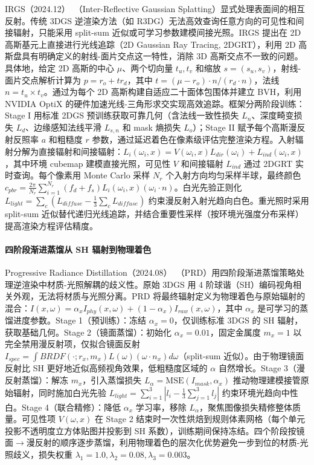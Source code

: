IRGS（2024.12）~\cite{2412_15867}（Inter-Reflective Gaussian Splatting）显式处理表面间的相互反射。传统 3DGS 逆渲染方法（如 R3DG）无法高效查询任意方向的可见性和间接辐射，只能采用 split-sum 近似或可学习参数建模间接光照。IRGS 提出在 2D 高斯基元上直接进行光线追踪（2D Gaussian Ray Tracing, 2DGRT），利用 2D 高斯盘具有明确定义的射线-面片交点这一特性，消除 3D 高斯交点不一致的问题。具体地，给定 2D 高斯的中心 $\mu$、两个切向量 $t_u, t_v$ 和缩放 $s=(s_u,s_v)$，射线-面片交点解析计算为 $p = r_o + t r_d$，其中 $t = (\mu - r_o) \cdot n / (r_d \cdot n)$，法线 $n = t_u \times t_v$。通过为每个 2D 高斯构建自适应二十面体包围体并建立 BVH，利用 NVIDIA OptiX 的硬件加速光线-三角形求交实现高效追踪。框架分两阶段训练：Stage I 用标准 2DGS 预训练获取可靠几何（含法线一致性损失 $L_n$、深度畸变损失 $L_d$、边缘感知法线平滑 $L_{s,n}$ 和 mask 熵损失 $L_o$）；Stage II 赋予每个高斯漫反射反照率 $a$ 和粗糙度 $r$ 参数，通过延迟着色在像素级评估完整渲染方程。入射辐射分解为直接辐射和间接辐射：$L_i(\omega_i, x) = V(\omega_i, x) L_{dir}(\omega_i) + L_{ind}(\omega_i, x)$，其中环境 cubemap 建模直接光照，可见性 $V$ 和间接辐射 $L_{ind}$ 通过 2DGRT 实时查询。每个像素用 Monte Carlo 采样 $N_r$ 个入射方向均匀采样半球，最终颜色 $c_{pbr} = \frac{2\pi}{N_r}\sum_{i=1}^{N_r}(f_d+f_s) L_i(\omega_i, x)(\omega_i \cdot n)$。白光先验正则化 $L_{light} = \sum_c (L_{diffuse} - \frac{1}{3}\sum_c L_{diffuse})$ 约束漫反射入射光趋向白色。重光照时采用 split-sum 近似替代递归光线追踪，并结合重要性采样（按环境光强度分布采样）提高渲染方程评估精度。

\paragraph{四阶段渐进蒸馏从 SH 辐射到物理着色}

Progressive Radiance Distillation（2024.08）~\cite{2408_07595}（PRD）用四阶段渐进蒸馏策略处理逆渲染中材质-光照解耦的歧义性。原始 3DGS 用 4 阶球谐（SH）编码视角相关外观，无法将材质与光照分离。PRD 将最终辐射定义为物理着色与原始辐射的混合：$I(x,\omega) = \alpha_x I_{phy}(x,\omega) + (1-\alpha_x) I_{raw}(x,\omega)$，其中 $\alpha_x$ 是可学习的蒸馏进度参数。Stage 1（预训练）：冻结 $\alpha_x=0$，仅训练标准 3DGS 的 SH 辐射，获取基础几何。Stage 2（镜面蒸馏）：初始化 $\alpha_x=0.01$，固定金属度 $m_x=1$ 以完全禁用漫反射项，仅拟合镜面反射 $I_{spec} = \int BRDF(\cdot; r_x, m_x) L(\omega) (\omega \cdot n_x) d\omega$（split-sum 近似）。由于物理镜面反射比 SH 更好地近似高频视角效果，低粗糙度区域的 $\alpha$ 自然增长。Stage 3（漫反射蒸馏）：解冻 $m_x$，引入蒸馏损失 $L_\alpha = \text{MSE}(I_{mask}, \alpha_x)$ 推动物理建模接管原始辐射，同时施加白光先验 $L_{light} = \sum_{i=1}^{3}|l_i - \frac{1}{3}\sum_{j=1}^{3} l_j|$ 约束环境光趋向中性白。Stage 4（联合精修）：降低 $\alpha_x$ 学习率，移除 $L_\alpha$，聚焦图像损失精修整体质量。可见性项 $V(\omega, x)$ 在 Stage 2 结束时一次性烘焙到规则体素网格（每个单元投影不透明度立方体贴图并投影到 SH 系数），训练期间保持冻结。四个阶段按镜面$\to$漫反射的顺序逐步蒸馏，利用物理着色的层次化优势避免一步到位的材质-光照歧义，损失权重 $\lambda_1=1.0, \lambda_2=0.08, \lambda_3=0.003$。

